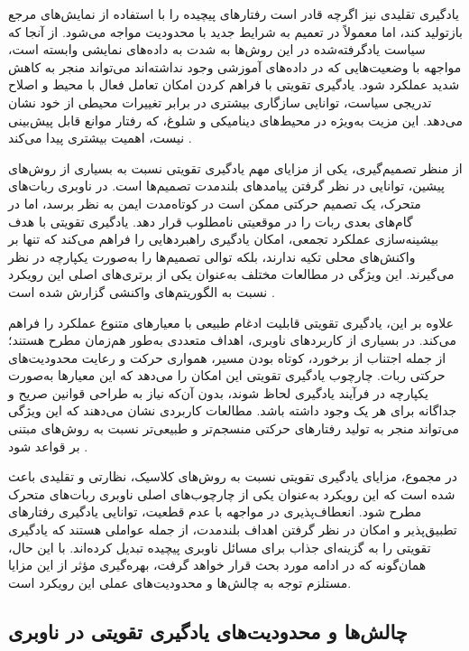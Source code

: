 یادگیری تقلیدی نیز اگرچه قادر است رفتارهای پیچیده را با استفاده از نمایش‌های مرجع بازتولید کند، اما معمولاً در تعمیم به شرایط جدید با محدودیت مواجه می‌شود. از آنجا که سیاست یادگرفته‌شده در این روش‌ها به شدت به داده‌های نمایشی وابسته است، مواجهه با وضعیت‌هایی که در داده‌های آموزشی وجود نداشته‌اند می‌تواند منجر به کاهش شدید عملکرد شود. یادگیری تقویتی با فراهم کردن امکان تعامل فعال با محیط و اصلاح تدریجی سیاست، توانایی سازگاری بیشتری در برابر تغییرات محیطی از خود نشان می‌دهد. این مزیت به‌ویژه در محیط‌های دینامیکی و شلوغ، که رفتار موانع قابل پیش‌بینی نیست، اهمیت بیشتری پیدا می‌کند%
\cite{s25113394}.

از منظر تصمیم‌گیری، یکی از مزایای مهم یادگیری تقویتی نسبت به بسیاری از روش‌های پیشین، توانایی در نظر گرفتن پیامدهای بلندمدت تصمیم‌ها است. در ناوبری ربات‌های متحرک، یک تصمیم حرکتی ممکن است در کوتاه‌مدت ایمن به نظر برسد، اما در گام‌های بعدی ربات را در موقعیتی نامطلوب قرار دهد. یادگیری تقویتی با هدف بیشینه‌سازی عملکرد تجمعی، امکان یادگیری راهبردهایی را فراهم می‌کند که تنها بر واکنش‌های محلی تکیه ندارند، بلکه توالی تصمیم‌ها را به‌صورت یکپارچه در نظر می‌گیرند. این ویژگی در مطالعات مختلف به‌عنوان یکی از برتری‌های اصلی این رویکرد نسبت به الگوریتم‌های واکنشی گزارش شده است%
\cite{Wang2020G2RL}.

علاوه بر این، یادگیری تقویتی قابلیت ادغام طبیعی با معیارهای متنوع عملکرد را فراهم می‌کند. در بسیاری از کاربردهای ناوبری، اهداف متعددی به‌طور هم‌زمان مطرح هستند؛ از جمله اجتناب از برخورد، کوتاه بودن مسیر، همواری حرکت و رعایت محدودیت‌های حرکتی ربات. چارچوب یادگیری تقویتی این امکان را می‌دهد که این معیارها به‌صورت یکپارچه در فرآیند یادگیری لحاظ شوند، بدون آن‌که نیاز به طراحی قوانین صریح و جداگانه برای هر یک وجود داشته باشد. مطالعات کاربردی نشان می‌دهند که این ویژگی می‌تواند منجر به تولید رفتارهای حرکتی منسجم‌تر و طبیعی‌تر نسبت به روش‌های مبتنی بر قواعد شود%
\cite{Lee2022DRLNavigation}.

در مجموع، مزایای یادگیری تقویتی نسبت به روش‌های کلاسیک، نظارتی و تقلیدی باعث شده است که این رویکرد به‌عنوان یکی از چارچوب‌های اصلی ناوبری ربات‌های متحرک مطرح شود. انعطاف‌پذیری در مواجهه با عدم قطعیت، توانایی یادگیری رفتارهای تطبیق‌پذیر و امکان در نظر گرفتن اهداف بلندمدت، از جمله عواملی هستند که یادگیری تقویتی را به گزینه‌ای جذاب برای مسائل ناوبری پیچیده تبدیل کرده‌اند. با این حال، همان‌گونه که در ادامه مورد بحث قرار خواهد گرفت، بهره‌گیری مؤثر از این مزایا مستلزم توجه به چالش‌ها و محدودیت‌های عملی این رویکرد است.
\subsection{چالش‌ها و محدودیت‌های یادگیری تقویتی در ناوبری}

